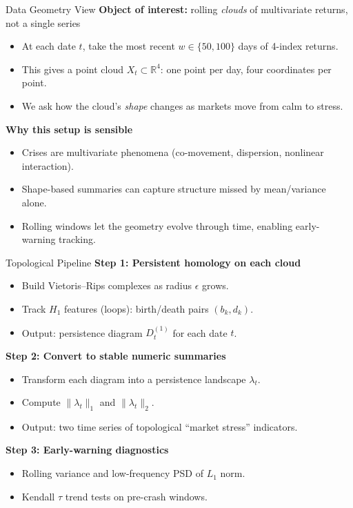 \documentclass[aspectratio=169,10pt]{beamer}
\begin{document}
\begin{frame}{Data Geometry View}
\textbf{Object of interest:} rolling \emph{clouds} of multivariate returns, not a single series
\begin{itemize}
  \item At each date \(t\), take the most recent \(w\in\{50,100\}\) days of 4-index returns.
  \item This gives a point cloud \(X_t\subset\mathbb{R}^4\): one point per day, four coordinates per point.
  \item We ask how the cloud's \emph{shape} changes as markets move from calm to stress.
\end{itemize}

\vspace{0.4em}
\textbf{Why this setup is sensible}
\begin{itemize}
  \item Crises are multivariate phenomena (co-movement, dispersion, nonlinear interaction).
  \item Shape-based summaries can capture structure missed by mean/variance alone.
  \item Rolling windows let the geometry evolve through time, enabling early-warning tracking.
\end{itemize}
\end{frame}

\begin{frame}{Topological Pipeline}
\textbf{Step 1: Persistent homology on each cloud}
\begin{itemize}
  \item Build Vietoris--Rips complexes as radius \(\epsilon\) grows.
  \item Track \(H_1\) features (loops): birth/death pairs \((b_k,d_k)\).
  \item Output: persistence diagram \(D_t^{(1)}\) for each date \(t\).
\end{itemize}

\textbf{Step 2: Convert to stable numeric summaries}
\begin{itemize}
  \item Transform each diagram into a persistence landscape \(\lambda_t\).
  \item Compute \(\|\lambda_t\|_1\) and \(\|\lambda_t\|_2\).
  \item Output: two time series of topological ``market stress'' indicators.
\end{itemize}

\textbf{Step 3: Early-warning diagnostics}
\begin{itemize}
  \item Rolling variance and low-frequency PSD of \(L_1\) norm.
  \item Kendall \(\tau\) trend tests on pre-crash windows.
\end{itemize}
\end{frame}
\end{document}
